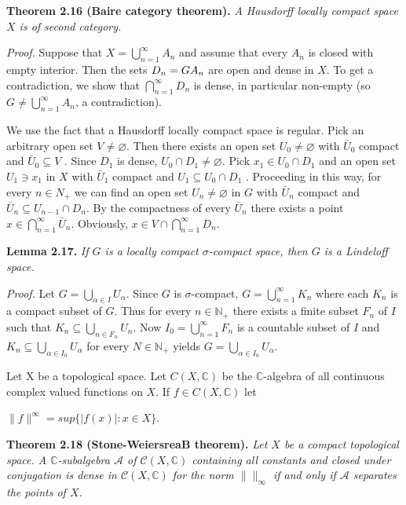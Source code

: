 \documentclass[12pt]{article}
\begin{document}
    \textbf{Theorem 2.16 (Baire category theorem).} \emph{A Hausdorff locally compact space $ X $ is of second category.}
    
    
        \emph{Proof.} Suppose that $ X = \bigcup^{\infty}_{n=1} A_n $ and assume that every $ A_n $ is closed with empty interior. Then the sets
    $ D_n = G \\ A_n $ are open and dense in $ X $. To get a contradiction, we show that $ \bigcap^{\infty}_{n=1} D_n $ is dense, in particular
    non-empty (so $ G \neq \bigcup^{\infty}_{n=1} A_n $, a contradiction).
    
    
        We use the fact that a Hausdorff locally compact space is regular. Pick an arbitrary open set $ V \neq \varnothing $. Then
    there exists an open set $ U_0 \neq \varnothing $ with $ \bar{U}_0 $ compact and $ \bar{U}_0 \subseteq V $ . Since $ D_1 $ is dense, $ U_0 \cap D_1 \neq \varnothing $. Pick $ x_1 \in U_0 \cap D_1 $
    and an open set $ U_1 \ni x_1 $ in $ X $ with $ \bar{U}_1 $ compact and $ U_1 \subseteq U_0 \cap D_1 $ . Proceeding in this way, for every $ n \in N_+ $
    we can find an open set $ U_n \neq \varnothing $ in $ G $ with $\bar{U}_n$ compact and $ \bar{U}_n \subseteq U_{n-1} \cap D_n $. By the compactness of every $ \bar{U}_n $
    there exists a point $ x \in \bigcap^{\infty}_{n=1} \bar{U}_n $. Obviously, $ x \in V \cap \bigcap^{\infty}_{n=1} D_n $.


    \textbf{Lemma 2.17.} \emph{If $ G $ is a locally compact $\sigma$-compact space, then $ G $ is a Lindeloff space.}
    
    
    \emph{Proof.} Let $ G = \bigcup_{\alpha \in I} U_{\alpha} $. Since $ G $ is $\sigma$-compact, $ G = \bigcup^{\infty}_{n=1} K_n $ where each $ K_n $ is a compact subset of $ G $.
    Thus for every $ n \in \mathbb{N}_+ $ there exists a finite subset $ F_n $ of $ I $ such that $ K_n \subseteq \bigcup_{n \in F_n} U_n $. Now $ I_0 = \bigcup^{\infty}_{n=1} F_n $ is a
    countable subset of $ I $ and $ K_n \subseteq \bigcup_{\alpha \in I_0} U_{\alpha} $ for every $ N \in \mathbb{N}_+ $ yields $ G = \bigcup_{\alpha \in I_0} U_{\alpha} $.
        
    
        Let X be a topological space. Let $ C(X, \mathbb{C}) $ be the $\mathbb{C}$-algebra of all continuous complex valued functions on
    $ X $. If $ f \in C(X, \mathbb{C}) $ let


    $\|f\|^{\infty} = sup\{|f(x)| : x \in X\}$.


    \textbf{Theorem 2.18 (Stone-WeiersreaB theorem).} \emph{Let $ X $ be a compact topological space. A $\mathbb{C}$-subalgebra $ \mathcal{A} $ of
    $ \mathcal{C}(X, \mathbb{C}) $ containing all constants and closed under conjugation is dense in $ \mathcal{C}(X, \mathbb{C}) $ for the norm $ \| \|_{\infty} $ if and
    only if $ \mathcal{A} $ separates the points of $ X $.}
    
\end{document}
